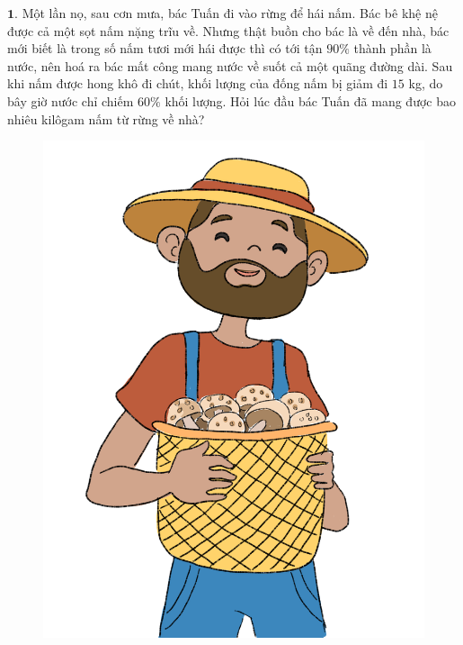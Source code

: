 \begin{multicols}{2}
	$\pmb{1.}$ Một lần nọ, sau cơn mưa, bác Tuấn đi vào rừng để hái nấm. Bác bê khệ nệ được cả một sọt nấm nặng trĩu về. Nhưng thật buồn cho bác là về đến nhà, bác mới biết là trong số nấm tươi mới hái được thì có tới tận $90\%$ thành phần là nước, nên hoá ra bác mất công mang nước về suốt cả một quãng đường dài. Sau khi nấm được hong khô đi chút, khối lượng của đống nấm bị giảm đi $15$ kg, do bây giờ nước chỉ chiếm $60\%$ khối lượng. Hỏi lúc đầu bác Tuấn đã mang được bao nhiêu kilôgam nấm từ rừng về nhà?
	
	\columnbreak
	\begin{figure}[H]
		\centering
		\captionsetup{labelformat= empty, justification=centering}
		\includegraphics[width=0.65\linewidth]{bai1}
	\end{figure}
	\end{multicols}
